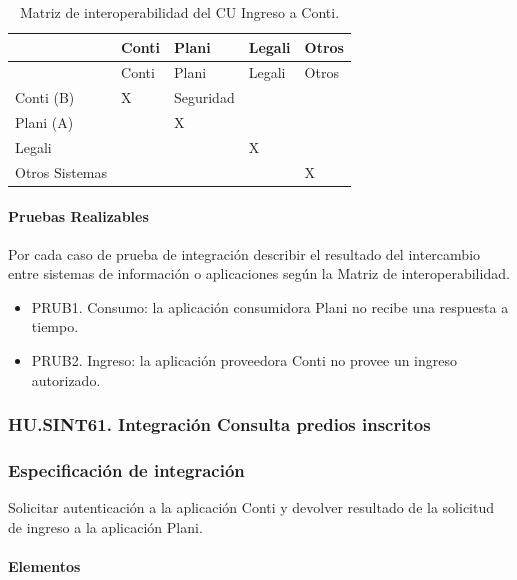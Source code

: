 \documentclass[
  paper=a4,
  ,captions=tableheading
]{scrartcl}
\providecommand{\tightlist}{%
  \setlength{\itemsep}{0pt}\setlength{\parskip}{0pt}}
\begin{document}
\begin{longtable}[]{@{}lllll@{}}
\caption{Matriz de interoperabilidad del CU Ingreso a
Conti.}\tabularnewline
\toprule\noalign{}
& Conti & Plani & Legali & Otros \\
\midrule\noalign{}
\endfirsthead
\toprule\noalign{}
& Conti & Plani & Legali & Otros \\
\midrule\noalign{}
\endhead
\bottomrule\noalign{}
\endlastfoot
Conti (B) & X & Seguridad & & \\
Plani (A) & & X & & \\
Legali & & & X & \\
Otros Sistemas & & & & X \\
\end{longtable}

\paragraph{Pruebas Realizables}\label{sec:pruebas-realizables-3}

Por cada caso de prueba de integración describir el resultado del
intercambio entre sistemas de información o aplicaciones según la Matriz
de interoperabilidad.

\begin{itemize}
\tightlist
\item
  PRUB1. Consumo: la aplicación consumidora Plani no recibe una
  respuesta a tiempo.
\item
  PRUB2. Ingreso: la aplicación proveedora Conti no provee un ingreso
  autorizado.
\end{itemize}

\subsubsection{HU.SINT61. Integración Consulta predios
inscritos}\label{sec:hu.sint61.-integraciuxf3n-consulta-predios-inscritos}

\subsubsection{Especificación de
integración}\label{sec:especificaciuxf3n-de-integraciuxf3n-4}

Solicitar autenticación a la aplicación Conti y devolver resultado de la
solicitud de ingreso a la aplicación Plani.

\paragraph{Elementos}\label{sec:elementos-4}
\end{document}

